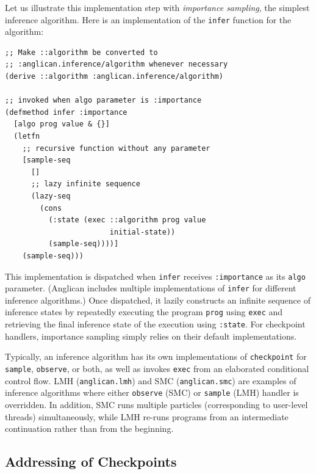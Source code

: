 \documentclass[preprint]{sigplanconf}
\begin{document}
Let us illustrate this implementation step with
\textit{importance sampling},
the simplest inference algorithm.
Here is an implementation of the \texttt{infer} function for the algorithm:
\begin{lstlisting}[style=default]
;; Make ::algorithm be converted to 
;; :anglican.inference/algorithm whenever necessary
(derive ::algorithm :anglican.inference/algorithm)

;; invoked when algo parameter is :importance
(defmethod infer :importance 
  [algo prog value & {}]
  (letfn
    ;; recursive function without any parameter
    [sample-seq 
      []
      ;; lazy infinite sequence 
      (lazy-seq
        (cons
          (:state (exec ::algorithm prog value
                        initial-state))
          (sample-seq))))]
    (sample-seq)))
\end{lstlisting}
This implementation is dispatched 
when \texttt{infer} receives \texttt{:importance} as its \texttt{algo} 
parameter. (Anglican includes multiple implementations of \texttt{infer}
for different inference algorithms.) Once dispatched, it lazily 
constructs an infinite sequence of inference states by repeatedly 
executing the program \texttt{prog} using \texttt{exec}
and retrieving the final inference state of the execution 
using \texttt{:state}. For checkpoint handlers, importance sampling simply
relies on their default implementations.

Typically, an inference
algorithm has its own implementations of
\texttt{checkpoint} for \texttt{sample}, \texttt{observe}, or
both, as well as invokes \texttt{exec} from an elaborated
conditional control flow. LMH (\texttt{anglican.lmh}) and SMC
(\texttt{anglican.smc}) are examples of inference algorithms
where either \texttt{observe} (SMC) or \texttt{sample} (LMH)
handler is overridden. In addition, SMC runs multiple particles
(corresponding to user-level threads) simultaneously, while LMH re-runs
programs from an intermediate continuation rather than from the
beginning.

\subsection{Addressing of Checkpoints}
\label{sec:addressing}
\end{document}
